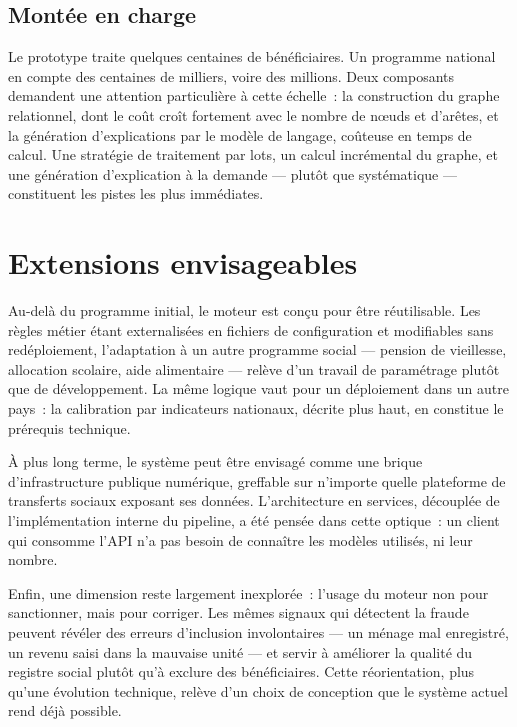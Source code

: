 \documentclass[a4paper, oneside, 12pt]{book}
\begin{document}
\subsection{Montée en charge}

\hspace{0.5cm}Le prototype traite quelques centaines de bénéficiaires. Un programme national en compte des centaines de milliers, voire des millions. Deux composants demandent une attention particulière à cette échelle~: la construction du graphe relationnel, dont le coût croît fortement avec le nombre de nœuds et d'arêtes, et la génération d'explications par le modèle de langage, coûteuse en temps de calcul. Une stratégie de traitement par lots, un calcul incrémental du graphe, et une génération d'explication à la demande — plutôt que systématique — constituent les pistes les plus immédiates.

\section{Extensions envisageables}

\hspace{0.5cm}Au-delà du programme initial, le moteur est conçu pour être réutilisable. Les règles métier étant externalisées en fichiers de configuration et modifiables sans redéploiement, l'adaptation à un autre programme social — pension de vieillesse, allocation scolaire, aide alimentaire — relève d'un travail de paramétrage plutôt que de développement. La même logique vaut pour un déploiement dans un autre pays~: la calibration par indicateurs nationaux, décrite plus haut, en constitue le prérequis technique.

\hspace{0.5cm}À plus long terme, le système peut être envisagé comme une brique d'infrastructure publique numérique, greffable sur n'importe quelle plateforme de transferts sociaux exposant ses données. L'architecture en services, découplée de l'implémentation interne du pipeline, a été pensée dans cette optique~: un client qui consomme l'API n'a pas besoin de connaître les modèles utilisés, ni leur nombre.

\hspace{0.5cm}Enfin, une dimension reste largement inexplorée~: l'usage du moteur non pour sanctionner, mais pour corriger. Les mêmes signaux qui détectent la fraude peuvent révéler des erreurs d'inclusion involontaires — un ménage mal enregistré, un revenu saisi dans la mauvaise unité — et servir à améliorer la qualité du registre social plutôt qu'à exclure des bénéficiaires. Cette réorientation, plus qu'une évolution technique, relève d'un choix de conception que le système actuel rend déjà possible.
\end{document}
